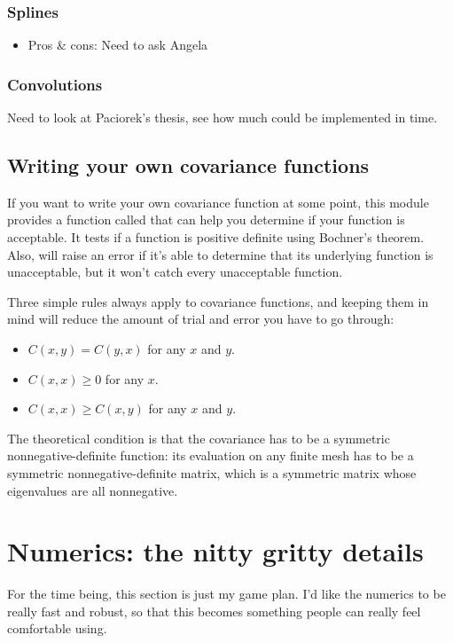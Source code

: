 \documentclass{manual}
\begin{document}
\subsection{Splines}\label{sub:splines}
\begin{itemize}
	\item Pros \& cons: Need to ask Angela
\end{itemize}

\subsection{Convolutions}\label{sub:convolutions}
Need to look at Paciorek's thesis, see how much could be implemented in time.



\section{Writing your own covariance functions}\label{sec:usercov} 
If you want to write your own covariance function at some point, this module provides a function called  that can help you determine if your function is acceptable. It tests if a function is positive definite using Bochner's theorem. Also,  will raise an error if it's able to determine that its underlying function is unacceptable, but it won't catch every unacceptable function. 

Three simple rules always apply to covariance functions, and keeping them in mind will reduce the amount of trial and error you have to go through:
\begin{itemize}
	\item $C(x,y)=C(y,x)$ for any $x$ and $y$.
	\item $C(x,x) \ge 0$ for any $x$.
	\item $C(x,x)\ge C(x,y)$ for any $x$ and $y$.
\end{itemize}

The theoretical condition is that the covariance has to be a symmetric nonnegative-definite function: its evaluation on any finite mesh has to be a symmetric nonnegative-definite matrix, which is a symmetric matrix whose eigenvalues are all nonnegative.





\chapter{Numerics: the nitty gritty details}\label{cha:numerics} %
For the time being, this section is just my game plan. I'd like the numerics to be really fast and robust, so that this becomes something people can really feel comfortable using. 
\end{document}
